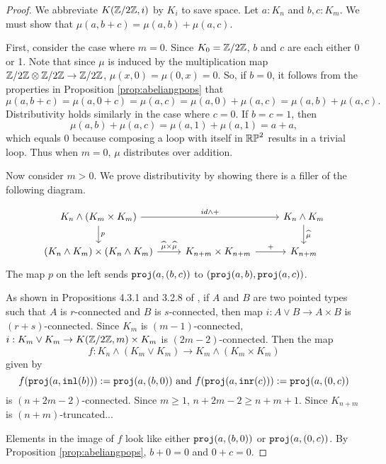 \documentclass{amsart}
\begin{document}
\begin{proof} We abbreviate $K(\mathbb{Z}/2\mathbb{Z},i)$ by $K_i$ to save space. Let $a:K_n$ and $b,c:K_m$. We must show that $\mu(a,b+c)=\mu(a,b)+\mu(a,c)$. 
	
	First, consider the case where $m=0$. Since $K_0=\mathbb{Z}/2\mathbb{Z}$, $b$ and $c$ are each either 0 or 1. Note that since $\mu$ is induced by the multiplication map $\mathbb{Z}/2\mathbb{Z}\otimes\mathbb{Z}/2\mathbb{Z}\to\mathbb{Z}/2\mathbb{Z}$, $\mu(x,0)=\mu(0,x)=0$. So, if $b=0$, it follows from the properties in Proposition \ref{prop:abeliangpops} that \[\mu(a,b+c)=\mu(a,0+c)=\mu(a,c)=\mu(a,0)+\mu(a,c)=\mu(a,b)+\mu(a,c).\]
	Distributivity holds similarly in the case where $c=0$. If $b=c=1$, then
	\[\mu(a,b)+\mu(a,c)=\mu(a,1)+\mu(a,1)=a+a,\]
	which equals 0 because composing a loop with itself in $\mathbb{RP}^2$ results in a trivial loop. Thus when $m=0$, $\mu$ distributes over addition.
	
	Now consider $m>0$. We prove distributivity by showing there is a filler of the following diagram.
	
	\[\begin{tikzcd}
	K_n\wedge\left(K_m\times K_m\right) \arrow[rr,"id\wedge+"] \arrow[d,"p"]&  & K_n\wedge K_m\arrow[d,"\widehat{\mu}"]\\
	\left(K_n\wedge K_m\right)\times\left(K_n\wedge K_m\right)\arrow[r,"\widehat{\mu}\times\widehat{\mu}"] & K_{n+m}\times K_{n+m}\arrow[r,"+"] &K_{n+m}	
	\end{tikzcd}\]
	The map $p$ on the left sends $\mathtt{proj}(a,(b,c))$ to $(\mathtt{proj}(a,b),\mathtt{proj}(a,c))$. 
	
	
	As shown in Propositions 4.3.1 and 3.2.8 of \cite{brunerie:thesis}, if $A$ and $B$ are two pointed types such that $A$ is $r$-connected and $B$ is $s$-connected, then map $i:A\vee B\to A\times B$ is $(r+s)$-connected. Since $K_{m}$ is $(m-1)$-connected, $i:K_{m}\vee K_{m}\to K(\mathbb{Z}/2\mathbb{Z},m)\times K_{m}$ is $(2m-2)$-connected. Then the map 
	\[f:K_{n}\wedge\left(K_{m}\vee K_{m}\right)\to K_{m}\wedge\left(K_{m}\times K_{m}\right)\]
	given by 
	\[f(\mathtt{proj}(a,\mathtt{inl}(b))):=\mathtt{proj}(a,(b,0))\text{~and~} f(\mathtt{proj}(a,\mathtt{inr}(c))):=\mathtt{proj}(a,(0,c))\]
	is $(n+2m-2)$-connected. Since $m\geq 1$, $n+2m-2\geq n+m+1$. Since $K_{n+m}$ is $(n+m)$-truncated...
	
	Elements in the image of $f$ look like either $\mathtt{proj}(a,(b,0))$ or $\mathtt{proj}(a,(0,c))$. By Proposition \ref{prop:abeliangpops}, $b+0=0$ and $0+c=0$. 
	

	
	\end{proof}
\end{document}
